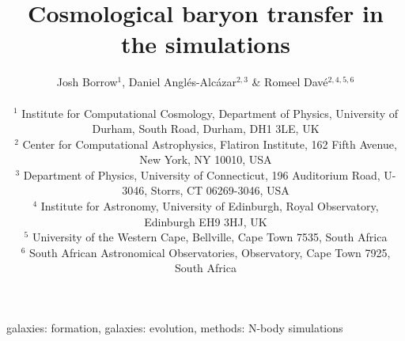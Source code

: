\documentclass[fleqn,usenatbib]{mnras}
\title{Cosmological baryon transfer in the \simba{} simulations}
\author[Borrow et al.]{
Josh Borrow$^{1}$,
Daniel Angl\'es-Alc\'azar$^{2, 3}$ \&
Romeel Dav\'e$^{2, 4, 5, 6}$
\\
\\$^1$ Institute for Computational Cosmology, Department of Physics, University of Durham, South Road, Durham, DH1 3LE, UK
\\$^2$ Center for Computational Astrophysics, Flatiron Institute, 162 Fifth Avenue, New York, NY 10010, USA 
\\$^3$ Department of Physics, University of Connecticut, 196 Auditorium Road, U-3046, Storrs, CT 06269-3046, USA
\\$^4$ Institute for Astronomy, University of Edinburgh, Royal Observatory, Edinburgh EH9 3HJ, UK
\\$^5$ University of the Western Cape, Bellville, Cape Town 7535, South Africa
\\$^6$ South African Astronomical Observatories, Observatory, Cape Town 7925, South Africa
}
\begin{document}
\maketitle

\begin{abstract}\end{abstract}

\begin{keywords}galaxies: formation, galaxies: evolution, methods: N-body simulations\end{keywords}











\end{document}
